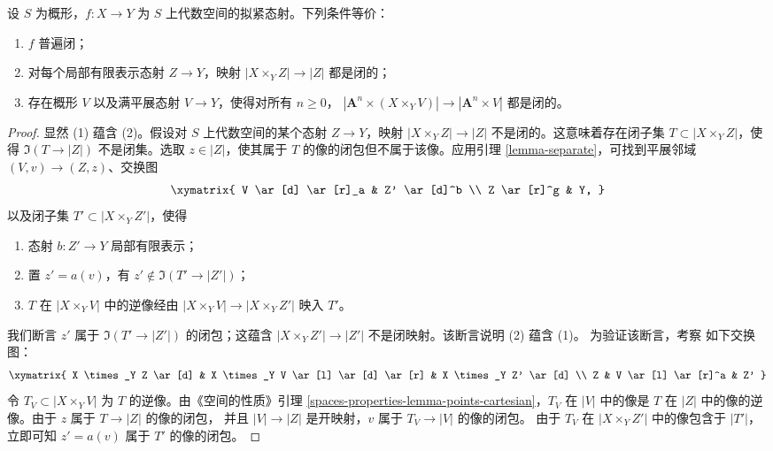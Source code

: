 \begin{lemma}
\label{lemma-test-universally-closed}
设 $S$ 为概形，$f : X \to Y$ 为 $S$ 上代数空间的拟紧态射。下列条件等价：
\begin{enumerate}
\item $f$ 普遍闭；
\item 对每个局部有限表示态射 $Z \to Y$，映射
$|X \times_Y Z| \to |Z|$ 都是闭的；
\item 存在概形 $V$ 以及满平展态射 $V \to Y$，使得对所有 $n \geq 0$，
$|\mathbf{A}^n \times (X \times_Y V)| \to |\mathbf{A}^n \times V|$
都是闭的。
\end{enumerate}
\end{lemma}

\begin{proof}
显然 (1) 蕴含 (2)。假设对 $S$ 上代数空间的某个态射 $Z \to Y$，映射
$|X \times_Y Z| \to |Z|$ 不是闭的。这意味着存在闭子集
$T \subset |X \times_Y Z|$，使得 $\Im(T \to |Z|)$ 不是闭集。选取
$z \in |Z|$，使其属于 $T$ 的像的闭包但不属于该像。应用引理
\ref{lemma-separate}，可找到平展邻域 $(V, v) \to (Z, z)$、交换图
$$
\xymatrix{
V \ar[d] \ar[r]_a & Z' \ar[d]^b \\
Z \ar[r]^g & Y,
}
$$
以及闭子集 $T' \subset |X \times_Y Z'|$，使得
\begin{enumerate}
\item 态射 $b : Z' \to Y$ 局部有限表示；
\item 置 $z' = a(v)$，有 $z' \not \in \Im(T' \to |Z'|)$；
\item $T$ 在 $|X \times_Y V|$ 中的逆像经由
$|X \times_Y V| \to |X \times_Y Z'|$ 映入 $T'$。
\end{enumerate}
我们断言 $z'$ 属于 $\Im(T' \to |Z'|)$ 的闭包；这蕴含
$|X \times_Y Z'| \to |Z'|$ 不是闭映射。该断言说明 (2) 蕴含 (1)。
为验证该断言，考察%
如下交换图：
$$
\xymatrix{
X \times_Y Z \ar[d] &
X \times_Y V \ar[l] \ar[d] \ar[r] &
X \times_Y Z' \ar[d] \\
Z & V \ar[l] \ar[r]^a & Z'
}
$$
令 $T_V \subset |X \times_Y V|$ 为 $T$ 的逆像。由《空间的性质》引理
\ref{spaces-properties-lemma-points-cartesian}，$T_V$ 在 $|V|$ 中的像是
$T$ 在 $|Z|$ 中的像的逆像。由于 $z$ 属于 $T \to |Z|$ 的像的闭包，
并且 $|V| \to |Z|$ 是开映射，$v$ 属于 $T_V \to |V|$ 的像的闭包。
由于 $T_V$ 在 $|X \times_Y Z'|$ 中的像包含于 %
$|T'|$，立即可知 $z' = a(v)$ 属于 $T'$ 的像的闭包。


\end{proof}
